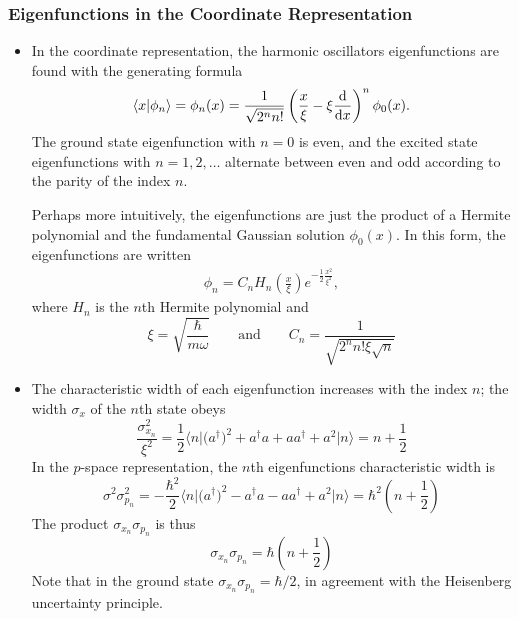 \documentclass[11pt, a4paper]{article}
\newcommand{\eqtext}[1]{\qquad \text{#1} \qquad}
\newcommand{\bmel}[3]{\big \langle {#1} \big | {#2} \big | {#3} \big \rangle}  %
\begin{document}
\subsubsection{Eigenfunctions in the Coordinate Representation}
\begin{itemize}
	\item In the coordinate representation, the harmonic oscillators eigenfunctions are found with the generating formula
	\begin{equation*}
		\braket{x}{\phi_{n}} = \phi_{n}(x) = \frac{1}{\sqrt{2^{n}n!}}\left(\frac{x}{\xi} - \xi \dv{x}\right)^{n}\phi_{0}(x).
	\end{equation*}
	The ground state eigenfunction with $ n = 0 $ is even, and the excited state eigenfunctions with $ n = 1, 2, \ldots $ alternate between even and odd according to the parity of the index $ n $. 
	
	Perhaps more intuitively, the eigenfunctions are just the product of a Hermite polynomial and the fundamental Gaussian solution $ \phi_{0}(x) $. In this form, the eigenfunctions are written
	\begin{align*}
		\phi_{n} = C_{n} H_{n}\left(\frac{x}{\xi}\right)e^{-\frac{1}{2}\frac{x^{2}}{\xi^{2}}},
	\end{align*}
	where $ H_{n} $ is the $ n $th Hermite polynomial and
	\begin{equation*}
		\xi = \sqrt{\frac{\hbar}{m \omega}} \eqtext{and} C_{n} = \frac{1}{\sqrt{2^{n}n!\xi \sqrt{n}}}
	\end{equation*}
	
	\item The characteristic width of each eigenfunction increases with the index $ n $; the width $ \sigma_{x} $ of the $ n $th state obeys
	\begin{equation*}
		\frac{\sigma_{x_{n}}^{2}}{\xi^{2}} = \frac{1}{2}\bmel{n}{\big(a^{\dagger}\big)^{2} + a^{\dagger}a + aa^{\dagger} + a^{2}}{n} = n + \frac{1}{2}
	\end{equation*}
	In the $ p $-space representation, the $ n $th eigenfunctions characteristic width is
	\begin{equation*}
		\sigma^{2} \sigma_{p_{n}}^{2} = - \frac{\hbar^{2}}{2}\bmel{n}{\big(a^{\dagger}\big)^{2} - a^{\dagger}a - aa^{\dagger} + a^{2}}{n} = \hbar^{2}\left(n + \frac{1}{2}\right)
	\end{equation*}
	The product $ \sigma_{x_{n}}\sigma_{p_{n}} $ is thus
	\begin{equation*}
		\sigma_{x_{n}}\sigma_{p_{n}} = \hbar\left(n + \frac{1}{2}\right)
	\end{equation*}
	Note that in the ground state $ \sigma_{x_{n}}\sigma_{p_{n}} = \hbar/2 $, in agreement with the Heisenberg uncertainty principle.
	
	
\end{itemize}
\end{document}
